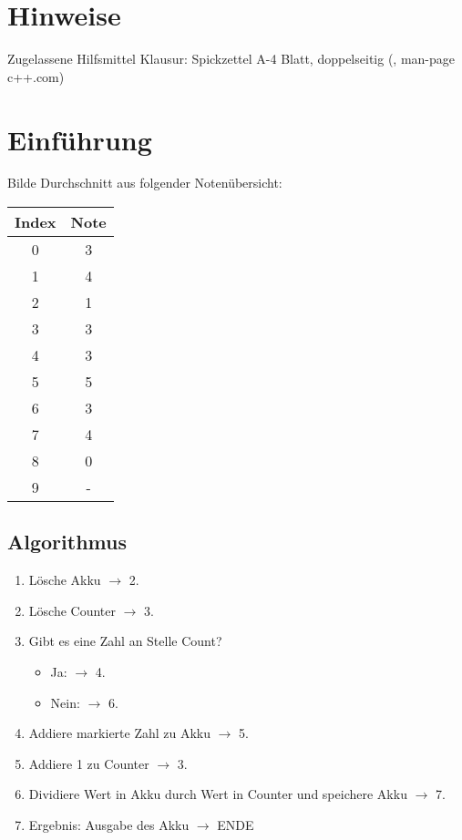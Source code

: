 





\maketitle
\newpage
\tableofcontents
\newpage

\section*{Hinweise}

Zugelassene Hilfsmittel Klausur: Spickzettel A-4 Blatt, doppelseitig (, man-page c++.com)

\section{Einführung}

Bilde Durchschnitt aus folgender Notenübersicht:

\begin{tabular}{c c}
Index & Note\\
\hline
0&3\\
1&4\\
2&1\\
3&3\\
4&3\\
5&5\\
6&3\\
7&4\\
8&0\\
9&-\\
\end{tabular}

\subsection{Algorithmus}
\begin{enumerate}
\item Lösche Akku $\rightarrow$  2.
\item Lösche Counter $\rightarrow$  3.
\item Gibt es eine Zahl an Stelle Count? 
\begin{itemize}
\item Ja: $\rightarrow$  4.
\item Nein: $\rightarrow$  6.
\end{itemize}
\item Addiere markierte Zahl zu Akku $\rightarrow$  5.
\item Addiere 1 zu Counter $\rightarrow$  3.
\item Dividiere Wert in Akku durch Wert in Counter und speichere Akku $\rightarrow $ 7.
\item Ergebnis: Ausgabe des Akku $\rightarrow$ ENDE
\end{enumerate}

